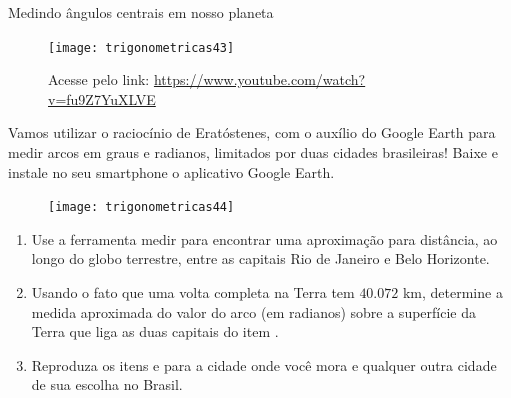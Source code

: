 \begin{task}{Medindo ângulos centrais em nosso planeta}
\begin{figure}[H]
\centering

\texttt{[image: trigonometricas43]}

\caption{Acesse pelo link: \url{https://www.youtube.com/watch?v=fu9Z7YuXLVE}}
\end{figure}

Vamos utilizar o raciocínio de Eratóstenes, com o auxílio do Google Earth para medir arcos em graus e radianos, limitados por duas cidades brasileiras! Baixe e instale no seu smartphone o aplicativo Google Earth.


\begin{figure}[H]
\centering

\texttt{[image: trigonometricas44]}
\end{figure}

\begin{enumerate}
\item Use a ferramenta medir para encontrar uma aproximação para distância, ao longo do globo terrestre, entre as capitais Rio de Janeiro e Belo Horizonte.
\item Usando o fato que uma volta completa na Terra tem $40.072$ km, determine a medida aproximada do valor do arco (em radianos) sobre a superfície da Terra que liga as duas capitais do item .
\item Reproduza os itens  e  para a cidade onde você mora e qualquer outra cidade de sua escolha no Brasil.
\end{enumerate}
\end{task}

